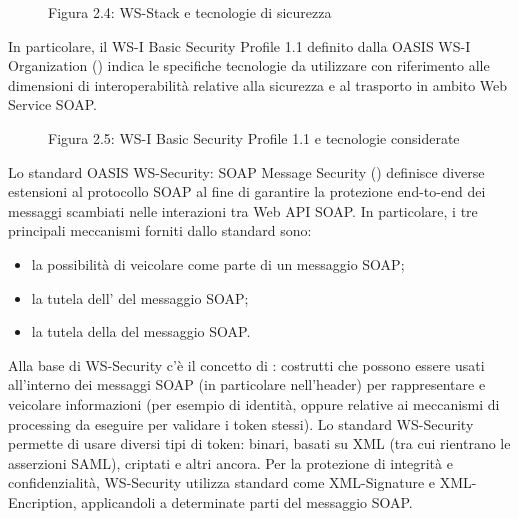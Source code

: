 \documentclass[letterpaper,10pt,italian]{sphinxmanual}
\begin{document}
\begin{figure}[htbp]
\centering
\capstart

\noindent{}
\caption{Figura 2.4: WS-Stack e tecnologie di sicurezza}\label{\detokenize{sez22:id4}}\end{figure}

In particolare, il WS-I Basic Security Profile 1.1 definito dalla OASIS WS-I Organization () indica le specifiche tecnologie da utilizzare con riferimento alle dimensioni di interoperabilità relative alla sicurezza e al trasporto in ambito Web Service SOAP.

\begin{figure}[htbp]
\centering
\capstart

\noindent{}
\caption{Figura 2.5: WS-I Basic Security Profile 1.1 e tecnologie considerate}\label{\detokenize{sez22:id5}}\end{figure}

Lo standard OASIS WS-Security: SOAP Message Security () definisce diverse estensioni al protocollo SOAP al fine di garantire la protezione end-to-end dei messaggi scambiati nelle interazioni tra Web API SOAP. In particolare, i tre principali meccanismi forniti dallo standard  sono:
\begin{itemize}
\item {} 
la possibilità di veicolare  come parte di un messaggio SOAP;

\item {} 
la tutela dell’ del messaggio SOAP;

\item {} 
la tutela della  del messaggio SOAP.

\end{itemize}

Alla base di WS-Security c’è il concetto di : costrutti che possono essere usati all’interno dei messaggi SOAP (in particolare nell’header) per rappresentare e veicolare informazioni (per esempio di identità, oppure relative ai meccanismi di processing da eseguire per validare i token stessi). Lo standard WS-Security permette di usare diversi tipi di token: binari, basati su XML (tra cui rientrano le asserzioni SAML), criptati e altri ancora. Per la protezione di integrità e confidenzialità, WS-Security utilizza standard come XML-Signature e XML-Encription, applicandoli a determinate parti del messaggio SOAP.
\end{document}
